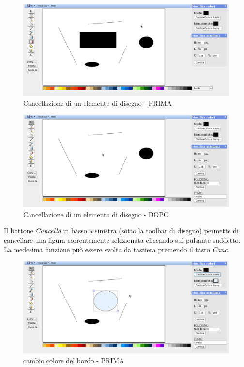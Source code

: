 

\begin{figure}[!ht]
\centering
\includegraphics[scale=0.4]{images/cancella_elemento_prima.png}
\caption{Cancellazione di un elemento di disegno  - PRIMA}
\end{figure} 

\begin{figure}[!ht]
\centering
\includegraphics[scale=0.4]{images/cancella_elemento_dopo.png}
\caption{Cancellazione di un elemento di disegno  - DOPO}
\end{figure}

\vspace{100pt}
Il bottone \textit{Cancella} in basso a sinistra (sotto la toolbar di disegno) permette di cancellare una figura correntemente selezionata cliccando sul pulsante suddetto. La medesima funzione pu\`o essere svolta da tastiera premendo il tasto \textit{Canc}.

\begin{figure}[!ht]
\centering
\includegraphics[scale=0.4]{images/colore_bordo_prima.png}
\caption{cambio colore del bordo  - PRIMA}
\end{figure} 

